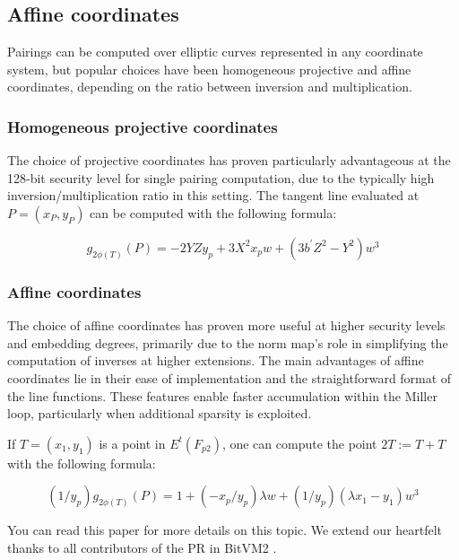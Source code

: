 \subsection{Affine coordinates}

Pairings can be computed over elliptic curves represented in any coordinate system, but popular choices have been homogeneous projective and affine coordinates, depending on the ratio between inversion and multiplication.

\subsubsection{Homogeneous projective coordinates} 
The choice of projective coordinates has proven particularly advantageous at the 128-bit security level for single pairing
computation, due to the typically high inversion/multiplication ratio in this setting. The tangent line evaluated at
$ P = (x_P , y_P)$ can be computed with the following formula:

\begin{equation}
    g_{2\phi(T)}(P) = -2YZy_p + 3X^2x_pw + (3b^{'}Z^2 - Y^2)w^3
\end{equation}

\subsubsection{Affine coordinates} 

The choice of affine coordinates has proven more useful at higher security levels and embedding degrees, primarily due to 
the norm map's role in simplifying the computation of inverses at higher extensions. The main advantages of affine coordinates 
lie in their ease of implementation and the straightforward format of the line functions. These features enable faster 
accumulation within the Miller loop, particularly when additional sparsity is exploited.

If $ T = (x_1, y_1)$ is a point in $E^t(F_{p2})$, one can compute the point $ 2T := T + T $ with the following formula:

\begin{equation}
    (1 / y_p)g_{2\phi(T)}(P) = 1 + (-x_p/y_p)\lambda w + (1 / y_p)(\lambda x_1 - y_1)w^3
\end{equation}

You can read this paper \cite{website:The-realm-of-the-pairings} for more details on this topic. 
We extend our heartfelt thanks to all contributors of the PR \cite{website:PR} in BitVM2 \cite{website:BitVM2}.
